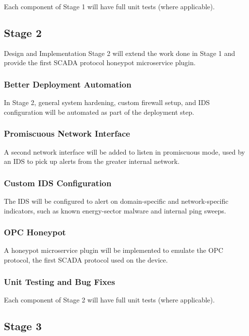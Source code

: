 Each component of Stage 1 will have full unit tests (where applicable).


\subsection{Stage 2}

Design and Implementation Stage 2 will extend the work done in Stage 1
and provide the first SCADA protocol honeypot microservice plugin.

\subsubsection{Better Deployment Automation}

In Stage 2, general system hardening, custom firewall setup, and IDS
configuration will be automated as part of the deployment step.

\subsubsection{Promiscuous Network Interface}

A second network interface will be added to listen in promiscuous mode, used
by an IDS to pick up alerts from the greater internal network.

\subsubsection{Custom IDS Configuration}

The IDS will be configured to alert on domain-specific and network-specific
indicators, such as known energy-sector malware and internal ping sweeps.

\subsubsection{OPC Honeypot}

A honeypot microservice plugin will be implemented to emulate the OPC protocol,
the first SCADA protocol used on the device.

\subsubsection{Unit Testing and Bug Fixes}

Each component of Stage 2 will have full unit tests (where applicable).


\subsection{Stage 3}

